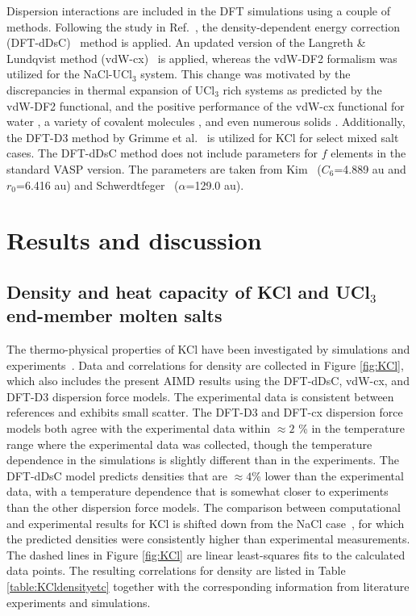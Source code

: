 \documentclass[preprint,3p,10pt,number,sort&compress]{elsarticle}
\begin{document}
Dispersion interactions are included in the DFT simulations using a couple of methods. Following the study in Ref.~\cite{Andersson}, the density-dependent energy correction (DFT-dDsC)~\cite{Steinmann2011,Steinmann2} method is applied. An updated version of the Langreth \& Lundqvist method (vdW-cx)~\cite{Dion2004,Klimes2010,Perez2009,Berland2014} is applied, whereas the vdW-DF2 formalism was utilized for the NaCl-UCl$_3$ system. This change was motivated by the discrepancies in thermal expansion of UCl$_3$ rich systems as predicted by the vdW-DF2 functional, and the positive performance of the vdW-cx functional for water \cite{Torres2021}, a variety of covalent molecules \cite{Berland2017}, and even numerous solids \cite{Tran2019}. Additionally, the DFT-D3 method by Grimme et al.~\cite{Grimme} is utilized for KCl for select mixed salt cases. The DFT-dDsC method does not include parameters for $f$ elements in the standard VASP version. The parameters are taken from Kim~\cite{Kim} ($C_6$=4.889 au and $r_0$=6.416 au) and Schwerdtfeger~\cite{pol} ($\alpha$=129.0 au).

\section{Results and discussion}
\label{sec:results}

\subsection{Density and heat capacity of KCl and UCl$_3$ end-member molten salts}
\label{sec:endmember}
The thermo-physical properties of KCl have been investigated by simulations and experiments~\cite{Janz1988,Artsdalen1955,Moon,DUEMMLER2022153414}. Data and correlations for density are collected in Figure \ref{fig:KCl}, which also includes the present AIMD results using the DFT-dDsC, vdW-cx, and DFT-D3 dispersion force models. The experimental data is consistent between references and exhibits small scatter. The DFT-D3 and DFT-cx dispersion force models both agree with the experimental data within $\approx 2$ \% in the temperature range where the experimental data was collected, though the temperature dependence in the simulations is slightly different than in the experiments. The DFT-dDsC model predicts densities that are $\approx 4$\% lower than the experimental data, with a temperature dependence that is somewhat closer to experiments than the other dispersion force models. The comparison between computational and experimental results for KCl is shifted down from the NaCl case~\cite{Andersson}, for which the predicted densities were consistently higher than experimental measurements. The dashed lines in Figure \ref{fig:KCl} are linear least-squares fits to the calculated data points. The resulting correlations for density are listed in Table \ref{table:KCldensityetc} together with the corresponding information from literature experiments and simulations. 
\end{document}
